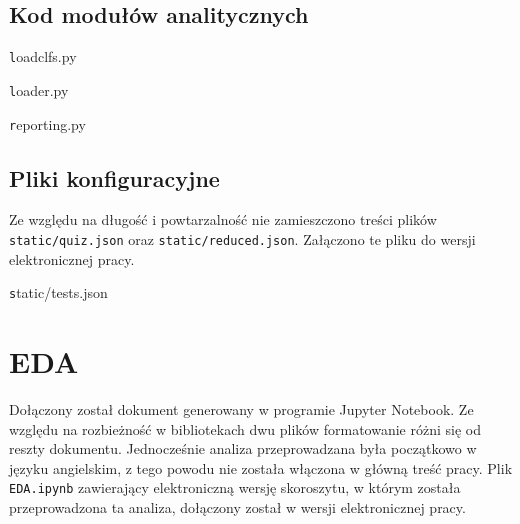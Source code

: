 \documentclass[12pt,a4paper,oneside]{report} %
\begin{document}
\section{Kod modułów analitycznych}
{\large\texttt loadclfs.py\par}

{\large\texttt loader.py \par}

{\large\texttt reporting.py\par}

\section{Pliki konfiguracyjne}
Ze względu na długość i powtarzalność nie zamieszczono treści plików \texttt{static/quiz.json} oraz \texttt{static/reduced.json}. Załączono te pliku do wersji elektronicznej pracy.
{\large\texttt static/tests.json\par}

%
%

\chapter{EDA}

Dołączony został dokument generowany w programie Jupyter Notebook. Ze względu na rozbieżność w bibliotekach dwu plików formatowanie różni się od reszty dokumentu. Jednocześnie analiza przeprowadzana była początkowo w języku angielskim, z tego powodu nie została włączona w główną treść pracy. Plik \texttt{EDA.ipynb} zawierający elektroniczną wersję skoroszytu, w którym została przeprowadzona ta analiza, dołączony został w wersji elektronicznej pracy.\par
\end{document}
